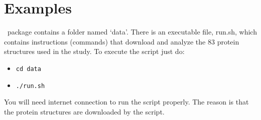 \chapter*{Examples}

\prins\ package contains a folder named `data'. There is an executable file, run.sh, which contains instructions (commands) that download and analyze the 83 protein structures used in the \cite{Jha2011} study. To execute the script just do:



\begin{itemize}
\item \verb!cd data!
\item \verb!./run.sh!
\end{itemize}


You will need internet connection to run the script properly. The reason is that the protein structures are downloaded by the script. 
